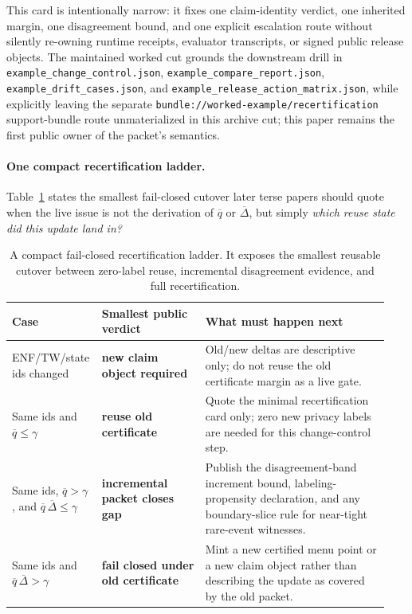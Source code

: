 \documentclass[11pt]{article}
\begin{document}
This card is intentionally narrow: it fixes one claim-identity verdict, one inherited margin, one disagreement bound, and one explicit escalation route without silently re-owning runtime receipts, evaluator transcripts, or signed public release objects. The maintained worked cut grounds the downstream drill in 
\nolinkurl{example\_change\_control.json}, 
\nolinkurl{example\_compare\_report.json}, 
\nolinkurl{example\_drift\_cases.json}, and 
\nolinkurl{example\_release\_action\_matrix.json}, while explicitly leaving the separate 
\nolinkurl{bundle://worked-example/recertification} support-bundle route unmaterialized in this archive cut; this paper remains the first public owner of the packet's semantics.\cite{series:workedexample,series:operationalB,series:eval1,series:releaseA}

\paragraph{One compact recertification ladder.}
Table~\ref{tab:recert-ladder} states the smallest fail-closed cutover later terse papers should quote when the live issue is not the derivation of $\overline q$ or $\overline{\Delta}$, but simply \emph{which reuse state did this update land in?}

\begin{table}[t]
\centering
\small
\begin{tabular}{@{}p{0.19\linewidth}p{0.27\linewidth}p{0.48\linewidth}@{}}
\toprule
Case & Smallest public verdict & What must happen next \\
\midrule
ENF/TW/state ids changed & \textbf{new claim object required} & Old/new deltas are descriptive only; do not reuse the old certificate margin as a live gate. \\
Same ids and $\overline q \le \gamma$ & \textbf{reuse old certificate} & Quote the minimal recertification card only; zero new privacy labels are needed for this change-control step. \\
Same ids, $\overline q > \gamma$, and $\overline q\,\overline{\Delta} \le \gamma$ & \textbf{incremental packet closes gap} & Publish the disagreement-band increment bound, labeling-propensity declaration, and any boundary-slice rule for near-tight rare-event witnesses. \\
Same ids and $\overline q\,\overline{\Delta} > \gamma$ & \textbf{fail closed under old certificate} & Mint a new certified menu point or a new claim object rather than describing the update as covered by the old packet. \\
\bottomrule
\end{tabular}
\caption{A compact fail-closed recertification ladder. It exposes the smallest reusable cutover between zero-label reuse, incremental disagreement evidence, and full recertification.}
\label{tab:recert-ladder}
\end{table}
\end{document}

